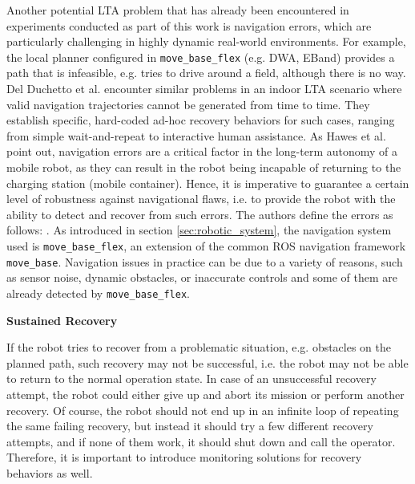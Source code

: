 \documentclass[english, master, utf8]{base/thesis_KBS}
\newcommand{\code}[1]{\colorbox{light-gray}{\texttt{#1}}}
\begin{document}
\noindent
Another potential LTA problem that has already been encountered in experiments conducted as part of this work is navigation errors, which are particularly challenging in
highly dynamic real-world environments. \cite{DelDuchetto:2018} For example, the local planner configured in \code{move\_base\_flex} (e.g. DWA, EBand) provides a path that
is infeasible, e.g. tries to drive around a field,  although there is no way. Del Duchetto et al. encounter similar problems in an indoor LTA scenario where valid navigation
trajectories cannot be generated from time to time.
They establish specific, hard-coded ad-hoc recovery behaviors for such cases, ranging from simple wait-and-repeat to interactive human assistance. \cite{DelDuchetto:2018} As Hawes
et al. \cite{Hawes:2017} point out, navigation errors are a critical factor in the long-term autonomy of a mobile robot, as they can result in the robot being incapable of returning
to the charging station (mobile container). Hence, it is imperative to guarantee a certain level of robustness against navigational flaws, i.e. to provide the robot with the
ability to detect and recover from such errors. \cite{DelDuchetto:2018}
The authors define the errors as follows: . \cite{DelDuchetto:2018}
As introduced in section \ref{sec:robotic_system}, the navigation system used is \code{move\_base\_flex}, an extension of the common ROS navigation framework \code{move\_base}.
Navigation issues in practice can be due to a variety of reasons, such as sensor noise, dynamic obstacles, or inaccurate controls \cite{DelDuchetto:2018} and some of them are already
detected by \code{move\_base\_flex}.\newline

\noindent
\textbf{Sustained Recovery}\newline

\noindent
If the robot tries to recover from a problematic situation, e.g. obstacles on the planned path, such recovery may not be successful, i.e. the robot may not be able
to return to the normal operation state. In case of an unsuccessful recovery attempt, the robot could either give up and abort its mission or perform another recovery.
Of course, the robot should not end up in an infinite loop of repeating the same failing recovery, but instead it should try a few different recovery attempts,
and if none of them work, it should shut down and call the operator. Therefore, it is important to introduce monitoring solutions for recovery behaviors as well.\newline
\end{document}
